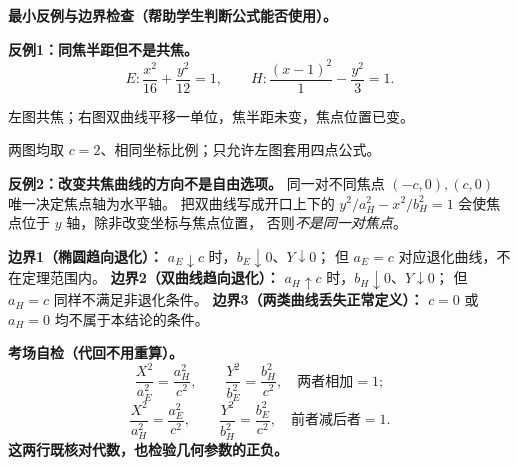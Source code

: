 \clearpage
\begin{trapbox}
\textbf{最小反例与边界检查（帮助学生判断公式能否使用）。}

\textbf{反例1：同焦半距但不是共焦。}
\[
E:\frac{x^2}{16}+\frac{y^2}{12}=1,\qquad
H:\frac{(x-1)^2}{1}-\frac{y^2}{3}=1.
\]
\begin{center}


{\small 左图共焦；右图双曲线平移一单位，焦半距未变，焦点位置已变。}
\end{center}
两图均取 $c=2$、相同坐标比例；只允许左图套用四点公式。

\textbf{反例2：改变共焦曲线的方向不是自由选项。}
同一对不同焦点 $(-c,0),(c,0)$ 唯一决定焦点轴为水平轴。
把双曲线写成开口上下的 $y^2/a_H^2-x^2/b_H^2=1$
会使焦点位于 $y$ 轴，除非改变坐标与焦点位置，
否则\emph{不是同一对焦点}。

\textbf{边界1（椭圆趋向退化）：}
$a_E\downarrow c$ 时，$b_E\downarrow0$、$Y\downarrow0$；
但 $a_E=c$ 对应退化曲线，不在定理范围内。
\textbf{边界2（双曲线趋向退化）：}
$a_H\uparrow c$ 时，$b_H\downarrow0$、$Y\downarrow0$；
但 $a_H=c$ 同样不满足非退化条件。
\textbf{边界3（两类曲线丢失正常定义）：}
$c=0$ 或 $a_H=0$ 均不属于本结论的条件。

\textbf{考场自检（代回不用重算）。}
\[
\frac{X^2}{a_E^2}=\frac{a_H^2}{c^2},\qquad
\frac{Y^2}{b_E^2}=\frac{b_H^2}{c^2},\quad
\text{两者相加}=1;
\]
\[
\frac{X^2}{a_H^2}=\frac{a_E^2}{c^2},\qquad
\frac{Y^2}{b_H^2}=\frac{b_E^2}{c^2},\quad
\text{前者减后者}=1.
\]
\textbf{这两行既核对代数，也检验几何参数的正负。}
\end{trapbox}
